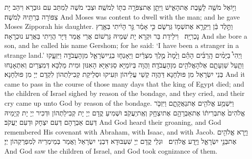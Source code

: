{וַיּ֥וֹאֶל מֹשֶׁ֖ה לָשֶׁ֣בֶת אֶת\maqqaf הָאִ֑ישׁ וַיִּתֵּ֛ן אֶת\maqqaf צִפֹּרָ֥ה בִתּ֖וֹ לְמֹשֶֽׁה׃}
{וּצְבִי מֹשֶׁה לְמִתַּב עִם גּוּבְרָא וִיהַב יָת צִפּוֹרָה בְּרַתֵּיהּ לְמֹשֶׁה׃}
{And Moses was content to dwell with the man; and he gave Moses Zipporah his daughter.}{}
{וַתֵּ֣לֶד בֵּ֔ן וַיִּקְרָ֥א אֶת\maqqaf שְׁמ֖וֹ גֵּרְשֹׁ֑ם כִּ֣י אָמַ֔ר גֵּ֣ר הָיִ֔יתִי בְּאֶ֖רֶץ נׇכְרִיָּֽה׃ \petucha }
{וִילֵידַת בַּר וּקְרָא יָת שְׁמֵיהּ גֵּרְשׁוֹם אֲרֵי אֲמַר דַּיָּר הֲוֵיתִי בַּאֲרַע נוּכְרָאָה׃}
{And she bore a son, and he called his name Gershom; for he said: ‘I have been a stranger in a strange land.’}{}
{וַיְהִי֩ בַיָּמִ֨ים הָֽרַבִּ֜ים הָהֵ֗ם וַיָּ֙מׇת֙ מֶ֣לֶךְ מִצְרַ֔יִם וַיֵּאָנְח֧וּ בְנֵֽי\maqqaf יִשְׂרָאֵ֛ל מִן\maqqaf הָעֲבֹדָ֖ה וַיִּזְעָ֑קוּ וַתַּ֧עַל שַׁוְעָתָ֛ם אֶל\maqqaf הָאֱלֹהִ֖ים מִן\maqqaf הָעֲבֹדָֽה׃}
{וַהֲוָה בְּיוֹמַיָּא סַגִּיאַיָּא הָאִנּוּן וּמִית מַלְכָּא דְּמִצְרַיִם וְאִתְאָנַחוּ בְּנֵי יִשְׂרָאֵל מִן פּוּלְחָנָא דַּהֲוָה קְשֵׁי עֲלֵיהוֹן וּזְעִיקוּ וּסְלֵיקַת קְבִילַתְהוֹן לִקְדָם יְיָ מִן פּוּלְחָנָא׃}
{And it came to pass in the course of those many days that the king of Egypt died; and the children of Israel sighed by reason of the bondage, and they cried, and their cry came up unto God by reason of the bondage.}{}
{וַיִּשְׁמַ֥ע אֱלֹהִ֖ים אֶת\maqqaf נַאֲקָתָ֑ם וַיִּזְכֹּ֤ר אֱלֹהִים֙ אֶת\maqqaf בְּרִית֔וֹ אֶת\maqqaf אַבְרָהָ֖ם אֶת\maqqaf יִצְחָ֥ק וְאֶֽת\maqqaf יַעֲקֹֽב׃}
{וּשְׁמִיעַ קֳדָם יְיָ יָת קְבִילַתְהוֹן וּדְכִיר יְיָ יָת קְיָמֵיהּ דְּעִם אַבְרָהָם דְּעִם יִצְחָק וּדְעִם יַעֲקֹב׃}
{And God heard their groaning, and God remembered His covenant with Abraham, with Isaac, and with Jacob.}{}
{וַיַּ֥רְא אֱלֹהִ֖ים אֶת\maqqaf בְּנֵ֣י יִשְׂרָאֵ֑ל וַיֵּ֖דַע אֱלֹהִֽים׃ \setuma }
{וּגְלֵי קֳדָם יְיָ שִׁעְבּוּדָא דִּבְנֵי יִשְׂרָאֵל וַאֲמַר בְּמֵימְרֵיהּ לְמִפְרַקְהוֹן יְיָ׃}
{And God saw the children of Israel, and God took cognizance of them.}{}
